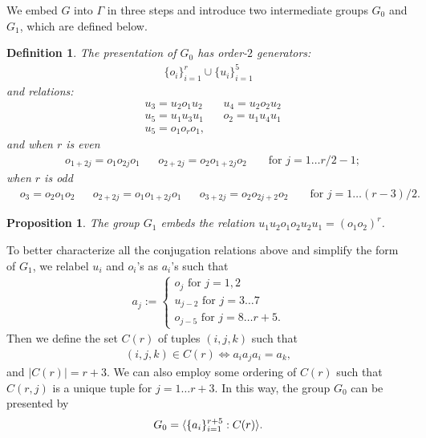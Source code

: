 \documentclass[11pt,letterpaper]{article}
\DeclarePairedDelimiter{\ip}{\langle}{\rangle}
\newcommand{\1}{\mathbb{1}}
\newtheorem{proposition}[theorem]{Proposition}
\newtheorem{definition}[theorem]{Definition}
\theoremstyle{definition}
\begin{document}
We embed $G$ into $\Gamma$ in three steps and introduce two intermediate groups $G_0$ and $G_1$, which are defined below.
\begin{definition}
	The presentation of $G_0$ has order-$2$ generators:
	\begin{align}
		\{o_i\}_{i=1}^{r} \cup \{u_i\}_{i=1}^5
	\end{align}
	and relations:
	\begin{align}
	&u_3 = u_2o_1u_2 && u_4 = u_2o_2u_2 \\
	&u_5 = u_1u_3u_1 && o_2 = u_1u_4u_1\\
	&u_5 = o_1 o_r o_1,
	\end{align}
	and when $r$ is even
	\begin{align}
	&o_{1+2j} = o_1o_{2j}o_1 && o_{2+2j} = o_2o_{1+2j}o_2&& \text{ for } j = 1 \dots r/2 - 1;
	\end{align}
	when $r$ is odd
	\begin{align}
	&o_3 = o_2o_1o_2 &&
	 o_{2+2j} =o_1o_{1+2j}o_1 && o_{3+2j} = o_2o_{2j+2}o_2 &&\text{ for } j = 1 \dots (r-3)/2.
	\end{align}
\end{definition}
\begin{proposition}
	The group $G_1$ embeds the relation $u_1u_2 o_1o_2 u_2u_1 = (o_1o_2)^r$.
\end{proposition}


To better characterize all the conjugation relations above and simplify the form of $G_1$, we relabel $u_i$ and $o_i$'s
as $a_i$'s such that
\begin{align}
	a_j := 
	\begin{cases}
	 o_j \text{ for } j = 1,2 \\
	 u_{j-2} \text{ for } j = 3\dots 7 \\
	o_{j- 5} \text{ for } j = 8 \dots r+5.
	\end{cases}
\end{align}
Then we define the set $C(r)$ of tuples $(i,j,k)$ such that
\begin{align}
	(i,j,k) \in C(r) \iff a_ia_ja_i = a_k,
\end{align}
and $|C(r)| = r+3$. We can also employ some ordering of $C(r)$ such that $C(r,j)$ is a unique tuple for 
$j = 1 \dots r+3$.
In this way, the group $G_0$ can be presented by
\begin{align}
	G_0  = \ip{ \{a_i\}_{i=1}^{r+5} : C(r) }.
\end{align}
\end{document}

